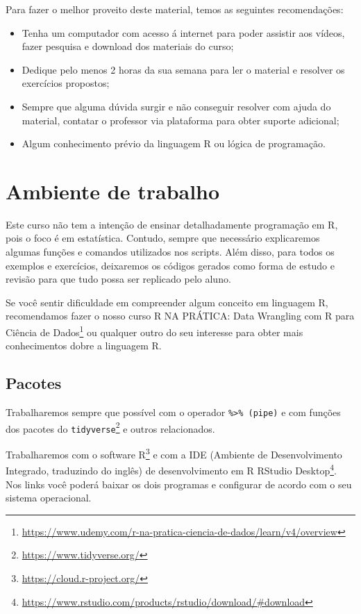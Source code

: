\documentclass[12pt,]{style/krantz}
\providecommand{\tightlist}{%
  \setlength{\itemsep}{0pt}\setlength{\parskip}{0pt}}
\renewcommand{\href}[2]{#2\footnote{\url{#1}}}
\theoremstyle{definition}
\theoremstyle{definition}
\theoremstyle{definition}
\theoremstyle{remark}
\begin{document}
Para fazer o melhor proveito deste material, temos as seguintes recomendações:

\begin{itemize}
\tightlist
\item
  Tenha um computador com acesso á internet para poder assistir aos vídeos, fazer pesquisa e download dos materiais do curso;
\item
  Dedique pelo menos 2 horas da sua semana para ler o material e resolver os exercícios propostos;
\item
  Sempre que alguma dúvida surgir e não conseguir resolver com ajuda do material, contatar o professor via plataforma para obter suporte adicional;
\item
  Algum conhecimento prévio da linguagem R ou lógica de programação.
\end{itemize}

\hypertarget{ambiente-de-trabalho}{%
\section*{Ambiente de trabalho}\label{ambiente-de-trabalho}}


Este curso não tem a intenção de ensinar detalhadamente programação em R, pois o foco é em estatística. Contudo, sempre que necessário explicaremos algumas funções e comandos utilizados nos scripts. Além disso, para todos os exemplos e exercícios, deixaremos os códigos gerados como forma de estudo e revisão para que tudo possa ser replicado pelo aluno.

Se você sentir dificuldade em compreender algum conceito em linguagem R, recomendamos fazer o nosso curso \href{https://www.udemy.com/r-na-pratica-ciencia-de-dados/learn/v4/overview}{R NA PRÁTICA: Data Wrangling com R para Ciência de Dados} ou qualquer outro do seu interesse para obter mais conhecimentos dobre a linguagem R.

\hypertarget{pacotes}{%
\subsection*{Pacotes}\label{pacotes}}


Trabalharemos sempre que possível com o operador \texttt{\%\textgreater{}\%\ (pipe)} e com funções dos pacotes do \href{https://www.tidyverse.org/}{\texttt{tidyverse}} e outros relacionados.

Trabalharemos com o \href{https://cloud.r-project.org/}{software R} e com a IDE (Ambiente de Desenvolvimento Integrado, traduzindo do inglês) de desenvolvimento em R \href{https://www.rstudio.com/products/rstudio/download/\#download}{RStudio Desktop}. Nos links você poderá baixar os dois programas e configurar de acordo com o seu sistema operacional.
\end{document}
